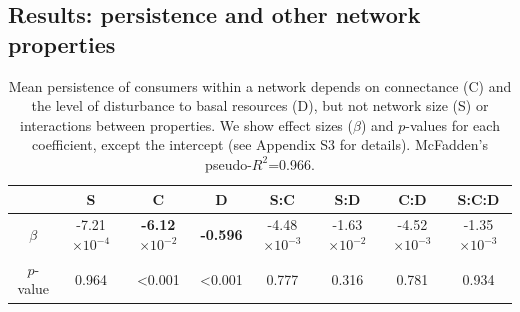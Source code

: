 \documentclass[12pt]{article}
\begin{document}
\begin{spacing}{2.0}
    
\clearpage 

\section{Results: persistence and other network properties} 

    
    \begin{table}[hb!]
        \caption{Mean persistence of consumers within a network depends on connectance (C) and the level of disturbance to basal resources (D), but not network size (S) or interactions between properties. We show effect sizes ($\beta$) and $p$-values for each coefficient, except the intercept (see Appendix S3 for details). McFadden's pseudo-$R^2$=0.966. }
        \label{tab:per_vs_SC}
        \centering
        \footnotesize
        \begin{tabular}{c| c c c c c c c}
              & S & C & D & S:C & S:D & C:D & S:C:D \\
            \hline
             $\beta$ &	 -7.21$\times10^{-4}$  	& \textbf{-6.12$\times10^{-2}$}	& \textbf{-0.596} &	 -4.48$\times10^{-3}$ &	 -1.63$\times10^{-2}$ 	& -4.52$\times10^{-3}$ &	 -1.35$\times10^{-3}$ \\
             $p$-value &		 0.964 &	 \textless0.001 &	 \textless0.001 &	 0.777 &	 0.316 &	 0.781 &	 0.934 \\
                    \end{tabular}
                \end{table}



\end{spacing}
\end{document}
